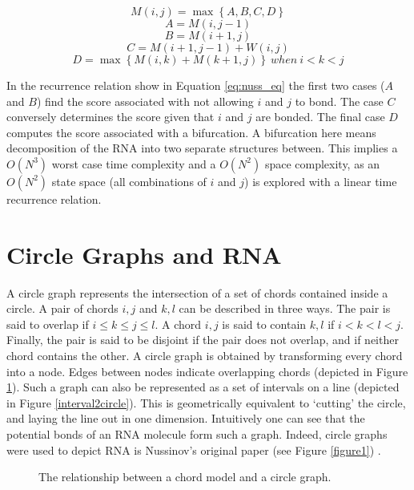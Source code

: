 \documentclass[12pt, a4paper]{article}
\begin{document}
\begin{equation} \label{eq:nuss_eq}
	M(i, j) = \max \left\lbrace A, B, C, D \right\rbrace 
\end{equation}
\[
A = M(i, j-1)
\]
\[
B = M(i+1, j)
\]
\[
C = M(i+1, j-1) + W(i, j)
\]
\[
D = \max \left\lbrace M(i, k) + M(k+1, j) \right\rbrace \: when \: i < k < j
\]


In the recurrence relation show in Equation \ref{eq:nuss_eq} the first two cases ($A$ and $B$) find the score associated with not allowing $i$ and $j$ to bond. The case $C$ conversely determines the score given that $i$ and $j$ are bonded. The final case $D$ computes the score associated with a bifurcation. A bifurcation here means decomposition of the RNA into two separate structures between. This implies a $O(N^3)$
worst case time complexity and a $O(N^2)$ space complexity, as an $O(N^2)$ state space (all combinations of $i$ and $j$) is explored
with a linear time recurrence relation.



\section*{Circle Graphs and RNA}
A circle graph represents the intersection of a set of chords contained inside a circle.
A pair of chords $i, j$ and $k, l$ can be described in three ways. The pair is said to overlap if $i \leq k \leq j \leq l$. A chord $i, j$ is said to contain $k, l$ if $i < k < l < j$. Finally, the pair is said to be disjoint if the pair does not overlap, and if neither chord contains the other. A circle graph is obtained by transforming every chord into a node. Edges between nodes indicate overlapping chords (depicted in Figure \ref{circle2graph}). Such a graph can also be represented as a set of intervals on a line (depicted in Figure \ref{interval2circle}). This is geometrically equivalent to `cutting' the circle, and laying the line out in one dimension. Intuitively one can see that the potential bonds of an RNA molecule form such a graph. Indeed, circle graphs were used to depict RNA is Nussinov's original paper (see Figure \ref{figure1}) \cite{nussinov1980fast}.

\begin{figure}
\begin{center}
\end{center}
\caption{The relationship between a chord model and a circle graph.}
\label{circle2graph}
\end{figure}
\end{document}

